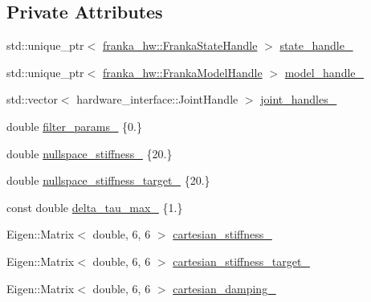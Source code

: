 \subsection*{Private Attributes}
\begin{DoxyCompactItemize}
\item 
std\+::unique\+\_\+ptr$<$ \hyperlink{classfranka__hw_1_1FrankaStateHandle}{franka\+\_\+hw\+::\+Franka\+State\+Handle} $>$ \hyperlink{classfranka__example__controllers_1_1CartesianImpedanceExampleController_affdc57722887831ee0e3e02332eae345}{state\+\_\+handle\+\_\+}
\item 
std\+::unique\+\_\+ptr$<$ \hyperlink{classfranka__hw_1_1FrankaModelHandle}{franka\+\_\+hw\+::\+Franka\+Model\+Handle} $>$ \hyperlink{classfranka__example__controllers_1_1CartesianImpedanceExampleController_a588de895d4aaef43c00bc11e6b789084}{model\+\_\+handle\+\_\+}
\item 
std\+::vector$<$ hardware\+\_\+interface\+::\+Joint\+Handle $>$ \hyperlink{classfranka__example__controllers_1_1CartesianImpedanceExampleController_a288ac917280b160d8a531ab3554de5e4}{joint\+\_\+handles\+\_\+}
\item 
double \hyperlink{classfranka__example__controllers_1_1CartesianImpedanceExampleController_a3684e222192042e190309d945c0f9589}{filter\+\_\+params\+\_\+} \{0.\}
\item 
double \hyperlink{classfranka__example__controllers_1_1CartesianImpedanceExampleController_ac47b4db7d9f39e3d7eac34396b8ff32b}{nullspace\+\_\+stiffness\+\_\+} \{20.\}
\item 
double \hyperlink{classfranka__example__controllers_1_1CartesianImpedanceExampleController_a3bfebd283e81cab2a5d303d75ba5a706}{nullspace\+\_\+stiffness\+\_\+target\+\_\+} \{20.\}
\item 
const double \hyperlink{classfranka__example__controllers_1_1CartesianImpedanceExampleController_a3ff07c9bb2c49cc9ac622bb2bd2c8f96}{delta\+\_\+tau\+\_\+max\+\_\+} \{1.\}
\item 
Eigen\+::\+Matrix$<$ double, 6, 6 $>$ \hyperlink{classfranka__example__controllers_1_1CartesianImpedanceExampleController_a37535313bb87e462a6c187c7ddce520f}{cartesian\+\_\+stiffness\+\_\+}
\item 
Eigen\+::\+Matrix$<$ double, 6, 6 $>$ \hyperlink{classfranka__example__controllers_1_1CartesianImpedanceExampleController_ab31e4b0d375e011ea3e3f745a6cfdded}{cartesian\+\_\+stiffness\+\_\+target\+\_\+}
\item 
Eigen\+::\+Matrix$<$ double, 6, 6 $>$ \hyperlink{classfranka__example__controllers_1_1CartesianImpedanceExampleController_a95cb6cf998a392f5bf9fa1201f0c595d}{cartesian\+\_\+damping\+\_\+}

\end{DoxyCompactItemize}
